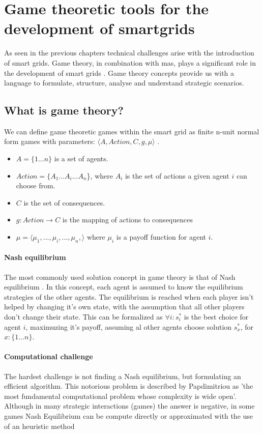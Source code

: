 \section{Game theoretic tools for the development of smartgrids}
As seen in the previous chapters technical challenges arise with the introduction of smart grids. Game theory, in combination with \gls{mas}, plays a significant role in the development of smart grids \cite{keypaper}. Game theory concepts provide us with a language to formulate, structure, analyse and understand strategic scenarios.

\subsection{What is game theory?}
We can define game theoretic games within the smart grid as finite n-unit normal form games with parameters: $\langle A,Action,C,g,\mu \rangle$ \cite{CourseInGameTheory}. \\
\begin{itemize}
    \item $A = \{1 ... n\}$ is a set of agents.
    \item $Action = \{A_{1} ... A_{i} ... A_{n}$\}, where $A_{i}$ is the set of actions a given agent $i$ can choose from.
    \item $C$ is the set of consequences.
    \item $g: Action \to C$ is the mapping of actions to consequences
    \item $\mu = \langle \mu_{1}, ..., \mu_{i}, ..., \mu_{n}, \rangle $ where $\mu_{i}$ is a payoff function for agent $i$.
\end{itemize}


\paragraph{Nash equilibrium} 
The most commonly used solution concept in game theory is that of Nash equilibrium \cite{CourseInGameTheory}. In this concept, each agent is assumed to know the equilibrium strategies of the other agents. The equilibrium is reached when each player isn't helped by changing it's own state, with the assumption that all other players don't change their state. 
This can be formalized as $\forall i: s^{*}_{i}$ is the best choice for agent $i$, maximuzing it's payoff, assuming al other agents choose solution $s^{*}_{x}$, for $x : \{1...n\}$. 

\paragraph{Computational challenge}
The hardest challenge is not finding a Nash equilibrium, but formulating an efficient algorithm. This notorious problem is described by Papdimitriou as 'the most fundamental computational problem whose complexity is wide open'\cite{daskalakis2009complexity}. Although in many strategic interactions (games) the answer is negative, in some games Nash Equilibrium can be compute directly or approximated with the use of an heuristic method\cite{MicrogridModellingPetrosAristidou,AumannGameTheoryAccomplish} 


